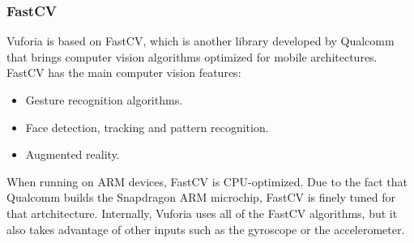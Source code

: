 \subsubsection{FastCV}
Vuforia is based on FastCV, which is another library developed by
Qualcomm that brings computer vision algorithms optimized for mobile
architectures. FastCV has the main computer vision features\cite{fastcv}:

\begin{itemize}
\item Gesture recognition algorithms.
\item Face detection, tracking and pattern recognition.
\item Augmented reality.
\end{itemize}

When running on ARM devices, FastCV is CPU-optimized. Due to the fact that Qualcomm
builds the Snapdragon ARM microchip, FastCV is finely tuned for that artchitecture. 
Internally, Vuforia uses all of the FastCV algorithms, but it also takes advantage
of other inputs such as the gyroscope or the accelerometer.
